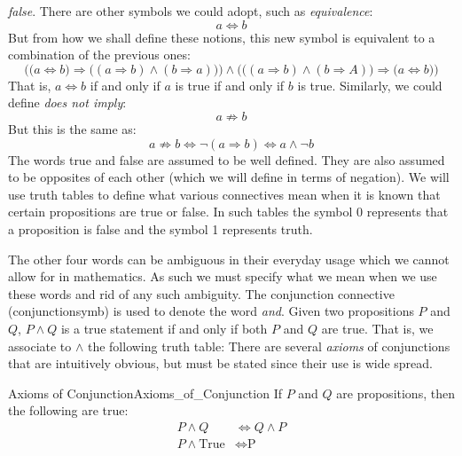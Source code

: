         \textit{false}. There are other symbols we could adopt, such as
        \textit{equivalence}:
        \begin{equation*}
            a\Leftrightarrow{b}
        \end{equation*}
        But from how we shall define these notions, this new symbol is equivalent to
        a combination of the previous ones:
        \begin{equation*}
            \Big(\big(a\Leftrightarrow{b}\big)\Rightarrow
                \big((a\Rightarrow{b})\land(b\Rightarrow{a})\big)\Big)
            \land\Big(\big((a\Rightarrow{b})\land(b\Rightarrow{A})\big)
                \Rightarrow\big(a\Leftrightarrow{b}\big)\Big)
        \end{equation*}
        That is, $a\Leftrightarrow{b}$ if and only if $a$ is true if and only if $b$
        is true. Similarly, we could define \textit{does not imply}:
        \begin{equation*}
            a\not\Rightarrow{b}
        \end{equation*}
        But this is the same as:
        \begin{equation*}
            a\not\Rightarrow{b}\Longleftrightarrow
            \neg(a\Rightarrow{b})
            \Longleftrightarrow
            a\land\neg{b}
        \end{equation*}
        The words true and false are assumed to be well defined. They are also
        assumed to be opposites of each other (which we will define in terms of
        negation). We will use truth tables to define what
        various connectives mean when it is known that certain propositions are true
        or false. In such tables the symbol 0 represents that a proposition is false
        and the symbol 1 represents truth.
        \par\hfill\par
        The other four words can be ambiguous in their everyday usage which we
        cannot allow for in mathematics. As such we must specify what we mean when
        we use these words and rid of any such ambiguity.
        The conjunction connective (\gls{conjunctionsymb}) is used to denote the
        word \textit{and}. Given two propositions $P$ and $Q$, $P\land{Q}$ is a true
        statement if and only if both $P$ and $Q$ are true. That is, we
        associate to $\land$ the following truth table:
        There are several \textit{axioms} of conjunctions that are intuitively
        obvious, but must be stated since their use is wide spread.
        \begin{faxiom}{Axioms of Conjunction}{Axioms_of_Conjunction}
            If $P$ and $Q$ are propositions, then the following are true:
            \begin{align}
                P\land{Q}&\Longleftrightarrow{Q}\land{P}
                \tag{Commutativity of Conjunction}\\
                P\land\textrm{True}&\Longleftrightarrow\textrm{P}
                \tag{Identity of Conjunction}
            \end{align}
        \end{faxiom}
